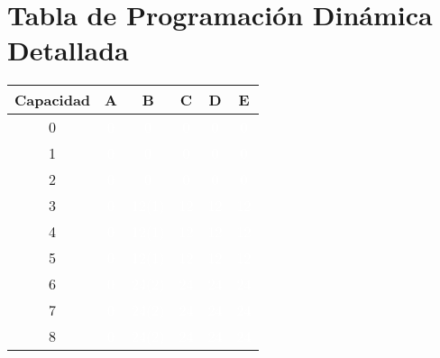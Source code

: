 \documentclass{article}
\begin{document}
\section*{Tabla de Programación Dinámica Detallada}
\begin{center}
\scriptsize
\begin{tabular}{|c|c|c|c|c|c|}
\hline
Capacidad & A & B & C & D & E \\ \hline
0 & \cellcolor{rojo}\textcolor{white}{0} & \cellcolor{rojo}\textcolor{white}{0} & \cellcolor{rojo}\textcolor{white}{0} & \cellcolor{rojo}\textcolor{white}{0} & \cellcolor{rojo}\textcolor{white}{0} \\ \hline
1 & \cellcolor{rojo}\textcolor{white}{0} & \cellcolor{rojo}\textcolor{white}{0} & \cellcolor{rojo}\textcolor{white}{0} & \cellcolor{rojo}\textcolor{white}{0} & \cellcolor{rojo}\textcolor{white}{0} \\ \hline
2 & \cellcolor{rojo}\textcolor{white}{0} & \cellcolor{rojo}\textcolor{white}{0} & \cellcolor{rojo}\textcolor{white}{0} & \cellcolor{rojo}\textcolor{white}{0} & \cellcolor{rojo}\textcolor{white}{0} \\ \hline
3 & \cellcolor{rojo}\textcolor{white}{0} & \cellcolor{verde}\textcolor{white}{12(1)} & \cellcolor{rojo}\textcolor{white}{12} & \cellcolor{rojo}\textcolor{white}{12} & \cellcolor{rojo}\textcolor{white}{12} \\ \hline
4 & \cellcolor{rojo}\textcolor{white}{0} & \cellcolor{verde}\textcolor{white}{12(1)} & \cellcolor{rojo}\textcolor{white}{12} & \cellcolor{rojo}\textcolor{white}{12} & \cellcolor{rojo}\textcolor{white}{12} \\ \hline
5 & \cellcolor{rojo}\textcolor{white}{0} & \cellcolor{verde}\textcolor{white}{12(1)} & \cellcolor{rojo}\textcolor{white}{12} & \cellcolor{rojo}\textcolor{white}{12} & \cellcolor{rojo}\textcolor{white}{12} \\ \hline
6 & \cellcolor{rojo}\textcolor{white}{0} & \cellcolor{verde}\textcolor{white}{24(2)} & \cellcolor{rojo}\textcolor{white}{24} & \cellcolor{rojo}\textcolor{white}{24} & \cellcolor{rojo}\textcolor{white}{24} \\ \hline
7 & \cellcolor{rojo}\textcolor{white}{0} & \cellcolor{verde}\textcolor{white}{24(2)} & \cellcolor{rojo}\textcolor{white}{24} & \cellcolor{rojo}\textcolor{white}{24} & \cellcolor{rojo}\textcolor{white}{24} \\ \hline
8 & \cellcolor{rojo}\textcolor{white}{0} & \cellcolor{verde}\textcolor{white}{24(2)} & \cellcolor{rojo}\textcolor{white}{24} & \cellcolor{rojo}\textcolor{white}{24} & \cellcolor{rojo}\textcolor{white}{24} \\ \hline

\end{tabular}
\end{center}
\end{document}
